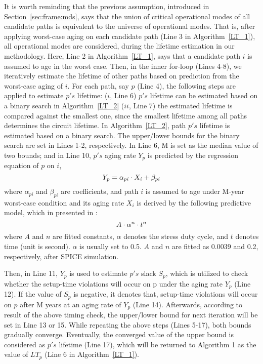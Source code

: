 It is worth reminding that the previous assumption, introduced in Section~\ref{sec:frame:mds}, says that the union of critical operational modes of all candidate paths is equivalent to the universe of operational modes. That is, after applying worst-case aging on each candidate path (Line 3 in Algorithm~\ref{LT_1}), all operational modes are considered, during the lifetime estimation in our methodology. Here, Line 2 in Algorithm~\ref{LT_1}, says that a candidate path $i$ is assumed to age in the worst case. Then, in the inner for-loop (Lines 4-8), we iteratively estimate the lifetime of other paths based on prediction from the worst-case aging of $i$. For each path, say $p$ (Line 4), the following steps are applied to estimate $p's$ lifetime: ($i$, Line 6) $p's$ lifetime can be estimated based on a binary search in Algorithm~\ref{LT_2} ($ii$, Line 7) the estimated lifetime is compared against the smallest one, since the smallest lifetime among all paths determines the circuit lifetime.
In Algorithm~\ref{LT_2}, path $p's$ lifetime is estimated based on a binary search. The upper/lower bounds for the binary search are set in Lines 1-2, respectively. In Line 6, M is set as the median value of two bounds; and in Line 10, $p's$ aging rate $Y_{p}$ is predicted by the regression equation of $p$ on $i$, 
\begin{equation*}
	\fontsize{8}{8} \selectfont
	Y_{p} = \alpha_{pi} \cdot X_{i} + \beta_{pi}
\end{equation*}
where $ \alpha_{pi}$ and $\beta_{pi}$ are coefficients, and path $i$ is assumed to age under M-year worst-case condition and its aging rate $X_{i}$ is derived by the following predictive model, which in presented in \cite{wang2007efficient}:
\begin{equation}
	\fontsize{8}{8} \selectfont
	A \cdot \alpha^n \cdot t^n 
	\label{eq:worst}
\end{equation}
where $A$ and $n$ are fitted constants, $\alpha$ denotes the stress duty cycle, and $t$ denotes time (unit is second). $\alpha$ is usually set to 0.5. $A$ and $n$ are fitted as 0.0039 and 0.2, respectively, after SPICE simulation.

Then, in Line 11, $Y_{p}$ is used to estimate $p's$ slack $S_{p}$, which is utilized to check whether the setup-time violations will occur on p under the aging rate $Y_{p}$ (Line 12). If the value of $S_{p}$ is negative, it denotes that, setup-time violations will occur on $p$ after M years at an aging rate of $Y_{p}$ (Line 14). Afterwards, according to result of the above timing check, the upper/lower bound for next iteration will be set in Line 13 or 15. While repeating the above steps (Lines 5-17), both bounds gradually converge. Eventually, the converged value of the upper bound is considered as $p's$ lifetime (Line 17), which will be returned to Algorithm 1 as the value of $LT_{p}$ (Line 6 in Algorithm~\ref{LT_1}).


